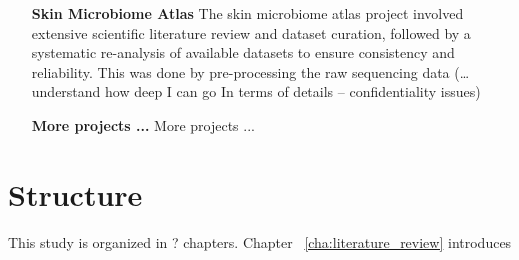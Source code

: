 \begin{enumerate}
\item[\textbf{Skin Microbiome Atlas}] The skin microbiome atlas project involved extensive scientific literature review and dataset curation, followed by a systematic re-analysis of available datasets to ensure consistency and reliability. This was done by pre-processing the raw sequencing data (…understand how deep I can go In terms of details – confidentiality issues)
\item[\textbf{More projects ...}] More projects ...
\end{enumerate}

\section{Structure} %
\label{sec:structure}

This study is organized in ? chapters. Chapter ~\ref{cha:literature_review} introduces 